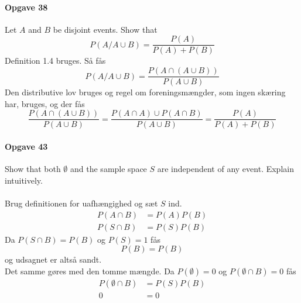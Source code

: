 \documentclass[12pt,a4paper,draft]{report}
\author{Frederik Appel Vardinghus-Nielsen}
\begin{document}
\paragraph{Opgave 38} Let $A$ and $B$  be disjoint  events. Show that
\begin{equation}
P(A/A\cup B)=\frac{P(A)}{P(A)+P(B)}
\end{equation}
Definition 1.4 bruges. Så fås
\begin{equation}
P(A/A\cup B)=\frac{P(A\cap (A\cup B))}{P(A\cup B)}
\end{equation}
Den distributive lov bruges og regel om foreningsmængder, som ingen skæring har, bruges, og der fås
\begin{equation}
\frac{P(A\cap (A\cup B))}{P(A\cup B)}=\frac{P(A\cap A)\cup P(A\cap B)}{P(A\cup B)}=\frac{P(A)}{P(A)+P(B)}
\end{equation}
\paragraph{Opgave 43}
Show that both $\emptyset$ and the sample space $S$ are independent  of any event. Explain intuitively.\\\\
Brug definitionen for uafhængighed og sæt $S$ ind.
\begin{align}
P(A\cap B)&=P(A)P(B)\\
P(S\cap B)&=P(S)P(B)
\end{align}
Da $P(S\cap B)=P(B)$ og $P(S)=1$ fås
\begin{equation}
P(B)=P(B)
\end{equation}
og udsagnet er altså sandt.\\
Det samme gøres med den tomme mængde. Da $P(\emptyset)=0$ og $P(\emptyset\cap B)=0$ fås
\begin{align}
P(\emptyset \cap B)&=P(S)P(B)\\
0&=0
\end{align}
\end{document}
